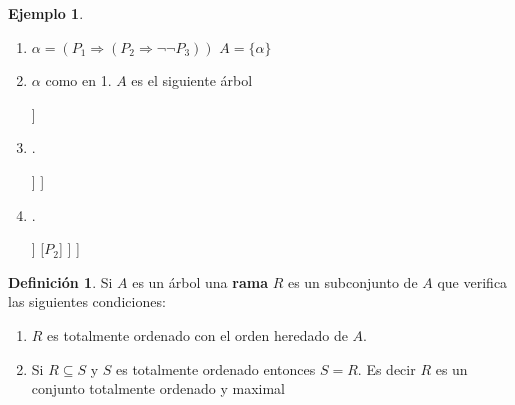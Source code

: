 \documentclass[a4paper,11pt]{article}
\theoremstyle{definition}
\newtheorem{defn}{Definición}[section]
\newtheorem{exap}{Ejemplo}[section]
\theoremstyle{remark}
\begin{document}
\begin{exap}
	\begin{enumerate}
		\item $\alpha = (P_1 \Rightarrow (P_2 \Rightarrow \lnot\lnot P_3))$ $A = \{\alpha\}$
		
		\item $\alpha$ como en 1. $A$ es el siguiente árbol
		
		\begin{forest}
			[$\alpha$
				[$\lnot P_1$]
				[$(P_1 \Rightarrow P_2)$]
			]
		\end{forest}
		
		\item.
		
		\begin{forest}
			[$\alpha$
				[$\lnot P_1$]
				[$(P_1 \Rightarrow P_2)$
					[$\lnot P_1$]
					[$P_2$]
				]
			]
		\end{forest}

		\item.
		
		\begin{forest}
			[$\alpha$
				[$\lnot P_1$]
				[$(P_1 \Rightarrow P_2)$
					[$\lnot P_1$
						[$\lnot P_1$]
						[$P_2$]
					]
					[$P_2$]
				]
			]
		\end{forest}
	\end{enumerate}
\end{exap}

\begin{defn}
	Si $A$ es un árbol una \textbf{rama} $R$ es un subconjunto de $A$ que verifica las siguientes condiciones:
	
	\begin{enumerate}
		\item $R$ es totalmente ordenado con el orden heredado de $A$.
		
		\item Si $R \subseteq S$ y $S$ es totalmente ordenado entonces $S = R$. Es decir $R$ es un conjunto
		totalmente ordenado y maximal
	\end{enumerate}
\end{defn}
\end{document}
